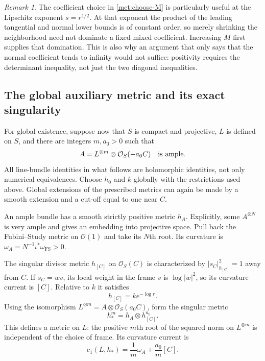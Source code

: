 \documentclass[11pt,a4paper]{article}
\numberwithin{equation}{section}
\theoremstyle{definition}
\theoremstyle{remark}
\newtheorem{remark}[theorem]{Remark}
\newcommand{\OO}{\mathcal O}
\newcommand{\cOne}{c_1}
\begin{document}
\begin{remark}\label{met:exponent-remark}
The coefficient choice in \eqref{met:choose-M} is particularly useful
at the Lipschitz exponent $s=r^{1/2}$. At that exponent the product of
the leading tangential and normal lower bounds is of constant order,
so merely shrinking the neighborhood need not dominate a fixed mixed
coefficient. Increasing $M$ first supplies that domination. This is
also why an argument that only says that the normal coefficient tends
to infinity would not suffice: positivity requires the determinant
inequality, not just the two diagonal inequalities.
\end{remark}

\subsection{The global auxiliary metric and its exact singularity}

For global existence, suppose now that $S$ is compact and projective,
$L$ is defined on $S$, and there are integers $m,a_0>0$ such that
\begin{equation}\label{met:ample-twist}
                     A=L^{\otimes m}\otimes\OO_S(-a_0C)
                     \quad\hbox{is ample}.
\end{equation}
All line-bundle identities in what follows are holomorphic identities,
not only numerical equivalences. Choose $h_0$ and $k$ globally with
the restrictions used above. Global extensions of the prescribed
metrics can again be made by a smooth extension and a cut-off equal
to one near $C$.

An ample bundle has a smooth strictly positive metric $h_A$. Explicitly,
some $A^{\otimes N}$ is very ample and gives an embedding into
projective space. Pull back the Fubini--Study metric on $\OO(1)$
and take its $N$th root. Its curvature is
$\omega_A=N^{-1}\iota^*\omega_{\mathrm{FS}}>0$.

The singular divisor metric $h_{[C]}$ on $\OO_S(C)$ is characterized
by $|s_C|_{h_{[C]}}^2=1$ away from $C$. If $s_C=w v$, its local
weight in the frame $v$ is $\log|w|^2$, so its curvature current is
$[C]$. Relative to $k$ it satisfies
\[
                         h_{[C]}=k e^{-\log r}.
\]
Using the isomorphism $L^{\otimes m}=A\otimes\OO_S(a_0C)$,
form the singular metric
\[
                         h_*^m=h_A\otimes h_{[C]}^{a_0}.
\]
This defines a metric on $L$: the positive $m$th root of the squared
norm on $L^{\otimes m}$ is independent of the choice of frame.
Its curvature current is
\begin{equation}\label{met:auxiliary-current}
            \cOne(L,h_*)=\frac1m\omega_A+\frac{a_0}{m}[C].
\end{equation}
\end{document}
